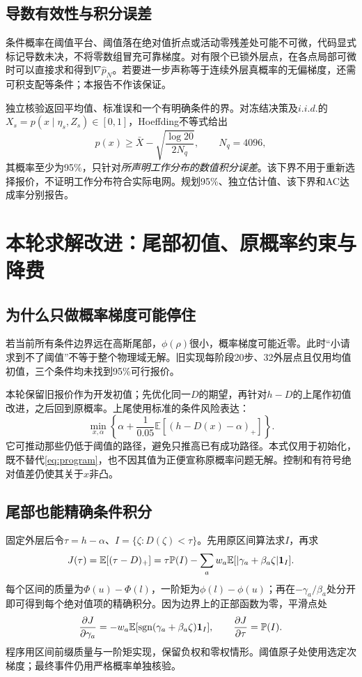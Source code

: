 \documentclass[UTF8,a4paper,11pt]{ctexart}
\newcommand{\E}{\mathbb E}\newcommand{\Prb}{\mathbb P}\newcommand{\R}{\mathbb R}
\begin{document}
\subsection{导数有效性与积分误差}
条件概率在阈值平台、阈值落在绝对值折点或活动零残差处可能不可微，代码显式标记导数未决，不将零数组冒充可靠梯度。对有限个已锁外层点，在各点局部可微时可以直接求和得到$\nabla\widehat p_N$。若要进一步声称等于连续外层真概率的无偏梯度，还需可积支配等条件；本报告不作该保证。

独立核验返回平均值、标准误和一个有明确条件的界。对冻结决策及$i.i.d.$的$X_s=p(x\mid\eta_s,Z_s)\in[0,1]$，Hoeffding不等式给出
\begin{equation}
 p(x)\geq\bar X-\sqrt{\frac{\log20}{2N_q}},\qquad N_q=4096,
\end{equation}
其概率至少为95\%，只针对\emph{所声明工作分布的数值积分误差}。该下界不用于重新选择报价，不证明工作分布符合实际电网。规划95\%、独立估计值、该下界和AC达成率分别报告。

\section{本轮求解改进：尾部初值、原概率约束与降费}
\subsection{为什么只做概率梯度可能停住}
若当前所有条件边界远在高斯尾部，$\phi(\rho)$很小，概率梯度可能近零。此时“小请求到不了阈值”不等于整个物理域无解。旧实现每阶段20步、32外层点且仅用均值初值，三个条件均未找到95\%可行报价。

本轮保留旧报价作为开发初值；先优化同一$D$的期望，再针对$h-D$的上尾作初值改进，之后回到原概率。上尾使用标准的条件风险表达\cite{rockafellar}：
\begin{equation}
 \min_{x,\alpha}\left\{\alpha+\frac1{0.05}\E[(h-D(x)-\alpha)_+]\right\}.\label{eq:tail}
\end{equation}
它可推动那些仍低于阈值的路径，避免只推高已有成功路径。本式仅用于初始化，既不替代\eqref{eq:program}，也不因其值为正便宣称原概率问题无解。控制和有符号绝对值差仍使其关于$x$非凸。

\subsection{尾部也能精确条件积分}
固定外层后令$\tau=h-\alpha$、$I=\{\zeta:D(\zeta)<\tau\}$。先用原区间算法求$I$，再求
\begin{equation}
 J(\tau)=\E[(\tau-D)_+]=\tau\Prb(I)-\sum_a w_a\E[|\gamma_a+\beta_a\zeta|\ind_I].
\end{equation}
每个区间的质量为$\Phi(u)-\Phi(l)$，一阶矩为$\phi(l)-\phi(u)$；再在$-\gamma_a/\beta_a$处分开即可得到每个绝对值项的精确积分。因为边界上的正部函数为零，平滑点处
\begin{equation}
 \frac{\partial J}{\partial \gamma_a}=-w_a\E[\operatorname{sgn}(\gamma_a+\beta_a\zeta)\ind_I],\qquad
 \frac{\partial J}{\partial\tau}=\Prb(I).
\end{equation}
程序用区间前缀质量与一阶矩实现，保留负权和零权情形。阈值原子处使用选定次梯度；最终事件仍用严格概率单独核验。
\end{document}
